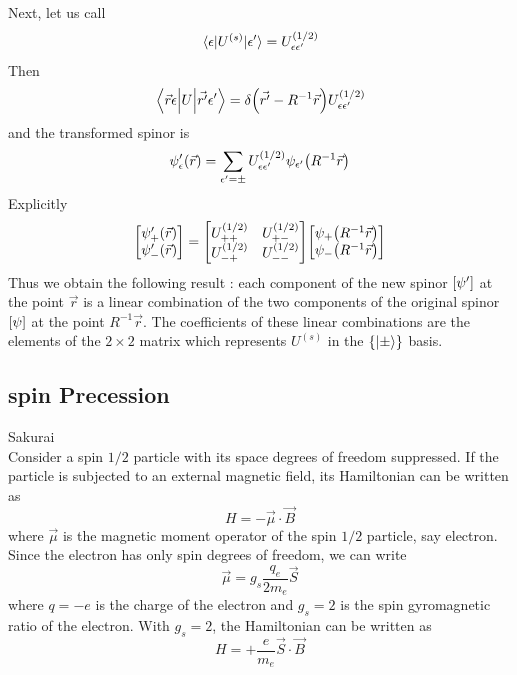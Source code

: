 Next, let us call
\begin{equation}
\mel{\epsilon}{U^{(s)}}{\epsilon^\prime} = U^{(1/2)}_{\epsilon\epsilon^\prime}
\end{equation}
Then
\begin{equation}
\mel{\vec{r}\epsilon}{U}{\vec{r^\prime}\epsilon^\prime} = \delta\qty(\vec{r^\prime} - R^{-1}\vec{r}) U^{(1/2)}_{\epsilon\epsilon^\prime}
\end{equation}
and the transformed spinor is
\begin{equation}
\psi^\prime_{\epsilon}\qty(\vec{r}) = \sum_{\epsilon^\prime = \pm} U^{(1/2)}_{\epsilon\epsilon^\prime} \psi_{\epsilon^\prime}\qty(R^{-1} \vec{r})
\end{equation}
Explicitly
\begin{equation}
\mqty[\psi^\prime_{+}\qty(\vec{r}) \\ \psi^\prime_{-}\qty(\vec{r})] = \mqty[U^{(1/2)}_{++} & U^{(1/2)}_{+-} \\ U^{(1/2)}_{-+} & U^{(1/2)}_{--}] \mqty[\psi_{+}\qty(R^{-1} \vec{r}) \\ \psi_{-}\qty(R^{-1} \vec{r}) ]
\end{equation}
Thus we obtain the following result : each component of the new spinor $\qty[\psi^\prime]$ at the point $\vec{r}$ is a linear combination of the two components of the original spinor $\qty[\psi]$ at the point $R^{-1}\vec{r}$. The coefficients of these linear combinations are the elements of the $2\times 2$ matrix which represents $U^{(s)}$ in the $\{\ket{\pm}\}$ basis.




\subsection{spin Precession}
Sakurai\\

Consider a spin $1/2$ particle with its space degrees of freedom suppressed. If the particle is subjected to an external magnetic field, its Hamiltonian can be written as
\begin{equation}
\label{chapter18.eqn1-spin-precession}
H = -\vec{\mu} \cdot \vec{B}
\end{equation}
where $\vec{\mu}$ is the magnetic moment operator of the spin $1/2$ particle, say electron. Since the electron has only spin degrees of freedom, we can write
\begin{equation}
\label{chapter18.eqn2-spin-precession}
\vec{\mu} = g_s \frac{q_e}{2 m_e} \vec{S}
\end{equation}
where $q=-e$ is the charge of the electron and $g_s=2$ is the spin gyromagnetic ratio of the electron. With $g_s=2$, the Hamiltonian can be written as
\begin{equation}
\label{chapter18.eqn3-spin-precession}
H = + \frac{e}{m_e} \vec{S}\cdot\vec{B}
\end{equation}

